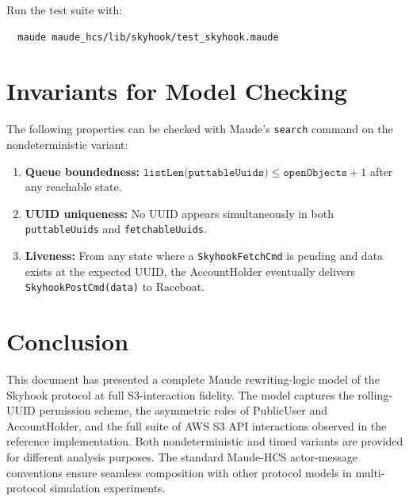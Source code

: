 \documentclass[11pt]{article}
\begin{document}
Run the test suite with:
\begin{verbatim}
  maude maude_hcs/lib/skyhook/test_skyhook.maude
\end{verbatim}

\section{Invariants for Model Checking}\label{sec:invariants}

The following properties can be checked with Maude's \texttt{search}
command on the nondeterministic variant:

\begin{enumerate}
  \item \textbf{Queue boundedness:}
    $\texttt{listLen(puttableUuids)} \leq \texttt{openObjects} + 1$
    after any reachable state.
  \item \textbf{UUID uniqueness:} No UUID appears simultaneously in
    both \texttt{puttableUuids} and \texttt{fetchableUuids}.
  \item \textbf{Liveness:} From any state where a
    \texttt{SkyhookFetchCmd} is pending and data exists at the expected
    UUID, the AccountHolder eventually delivers
    \texttt{SkyhookPostCmd(data)} to Raceboat.
\end{enumerate}

\section{Conclusion}

This document has presented a complete Maude rewriting-logic model of
the Skyhook protocol at full S3-interaction fidelity.  The model
captures the rolling-UUID permission scheme, the asymmetric roles of
PublicUser and AccountHolder, and the full suite of AWS S3 API
interactions observed in the reference implementation.  Both
nondeterministic and timed variants are provided for different analysis
purposes.  The standard Maude-HCS actor-message conventions ensure
seamless composition with other protocol models in multi-protocol
simulation experiments.
\end{document}
